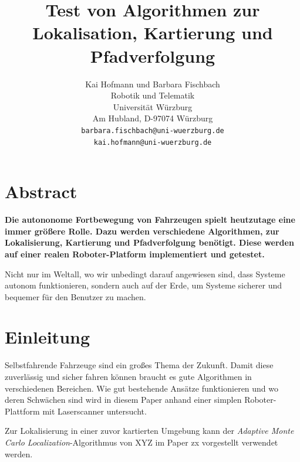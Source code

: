 \documentclass[11pt,a4paper]{article}
\begin{document}
\sloppy

\title{\Large\bf Test von Algorithmen zur Lokalisation, Kartierung und Pfadverfolgung }

\author{Kai Hofmann und Barbara Fischbach\\
  Robotik und Telematik \\
  Universit\"at W\"urzburg\\
  Am Hubland, D-97074 W\"urzburg\\
{\small \texttt{barbara.fischbach@uni-wuerzburg.de}}\\
{\small \texttt{kai.hofmann@uni-wuerzburg.de}}}

\date{}



\maketitle


\newpage

\twocolumn

\section*{Abstract}


\textbf{Die autononome Fortbewegung von Fahrzeugen spielt heutzutage eine immer gr\"o\ss{}ere Rolle. Dazu werden verschiedene Algorithmen, zur Lokalisierung, Kartierung und Pfadverfolgung ben\"otigt. Diese werden auf einer realen Roboter-Platform implementiert und getestet.}

Nicht nur im Weltall, wo wir unbedingt darauf angewiesen sind, dass Systeme autonom funktionieren, sondern auch auf der Erde, um Systeme sicherer und bequemer f\"ur den Benutzer zu machen. 


\section{Einleitung}
	Selbstfahrende Fahrzeuge sind ein gro{\ss}es Thema der Zukunft. Damit diese zuverl\"assig und sicher fahren k\"onnen braucht es gute Algorithmen in verschiedenen Bereichen. Wie gut bestehende Ans\"atze funktionieren und wo deren Schw\"achen sind wird in diesem Paper anhand einer simplen Roboter-Plattform mit Laserscanner untersucht. 

	Zur Lokalisierung in einer zuvor kartierten Umgebung kann der \textit{Adaptive Monte Carlo Localization}-Algorithmus von XYZ im Paper zx vorgestellt verwendet werden. 
	
\end{document}
